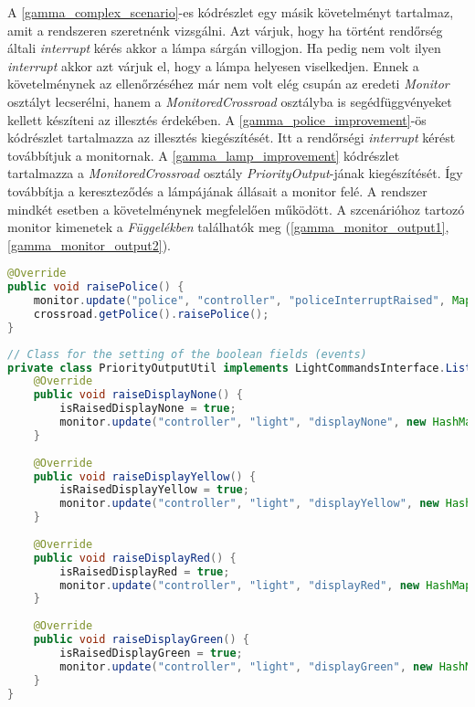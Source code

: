 A \ref{gamma_complex_scenario}-es kódrészlet egy másik követelményt tartalmaz, amit a rendszeren szeretnénk vizsgálni.
Azt várjuk, hogy ha történt rendőrség általi \textit{interrupt} kérés akkor a lámpa sárgán villogjon.
Ha pedig nem volt ilyen \textit{interrupt} akkor azt várjuk el, hogy a lámpa helyesen viselkedjen.
Ennek a követelménynek az ellenőrzéséhez már nem volt elég csupán az eredeti \textit{Monitor} osztályt lecserélni, hanem a \textit{MonitoredCrossroad} osztályba is segédfüggvényeket kellett készíteni az illesztés érdekében.
A \ref{gamma_police_improvement}-ös kódrészlet tartalmazza az illesztés kiegészítését.
Itt a rendőrségi \textit{interrupt} kérést továbbítjuk a monitornak.
A \ref{gamma_lamp_improvement} kódrészlet tartalmazza a \textit{MonitoredCrossroad} osztály \textit{PriorityOutput}-jának kiegészítését.
Így továbbítja a kereszteződés a lámpájának állásait a monitor felé.
A rendszer mindkét esetben a követelménynek megfelelően működött.
A szcenárióhoz tartozó monitor kimenetek a \textit{Függelékben} találhatók meg (\ref{gamma_monitor_output1}, \ref{gamma_monitor_output2}).

\begin{lstlisting}[language=java, frame=single, float=ht!, caption={\textit{Gamma} illesztéshez tartozó kódrészlet.},captionpos=b,label=gamma_police_improvement]
@Override
public void raisePolice() {
    monitor.update("police", "controller", "policeInterruptRaised", Map.of("success", true));
    crossroad.getPolice().raisePolice();
}
\end{lstlisting}

\begin{lstlisting}[language=java, frame=single, float=ht!, caption={\textit{MonitoredCrossroad} osztály kiegészítése a monitor illesztésével.},captionpos=b,label=gamma_lamp_improvement]
// Class for the setting of the boolean fields (events)
private class PriorityOutputUtil implements LightCommandsInterface.Listener.Provided {
    @Override
    public void raiseDisplayNone() {
        isRaisedDisplayNone = true;
        monitor.update("controller", "light", "displayNone", new HashMap<String, Object>());
    }
    
    @Override
    public void raiseDisplayYellow() {
        isRaisedDisplayYellow = true;
        monitor.update("controller", "light", "displayYellow", new HashMap<String, Object>());
    }
    
    @Override
    public void raiseDisplayRed() {
        isRaisedDisplayRed = true;
        monitor.update("controller", "light", "displayRed", new HashMap<String, Object>());
    }
    
    @Override
    public void raiseDisplayGreen() {
        isRaisedDisplayGreen = true;
        monitor.update("controller", "light", "displayGreen", new HashMap<String, Object>());
    }
}
\end{lstlisting}